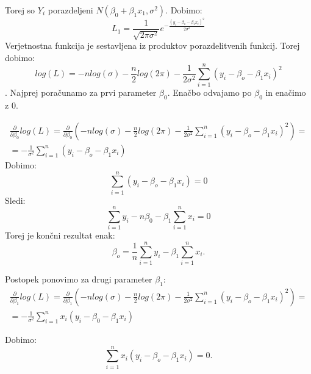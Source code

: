 \documentclass{article}
\begin{document}
Torej so $Y_i$ porazdeljeni $N( \beta_0+\beta_1x_1, \sigma^2)$.
Dobimo:
\begin{equation*}
L_1 = \frac{1}{\sqrt{2\pi \sigma^2}}e^{-{\frac{(y_i - \beta_o-\beta_1x_i)^2}{2\sigma^2}}}
\end{equation*}
Verjetnostna funkcija je sestavljena iz produktov porazdelitvenih funkcij. Torej dobimo:
\begin{equation*}
log(L) = -nlog(\sigma) - \frac{n}{2}log(2\pi)-\frac{1}{2\sigma^2}\sum_{i=1}^n (y_i-\beta_o-\beta_1x_i)^2
\end{equation*}.
Najprej poračunamo za prvi parameter $\beta_0$. Enačbo odvajamo po $\beta_0$ in enačimo z 0.

\begin{equation*}
\begin{split}
\frac{\partial}{\partial\beta_0} log(L) = \frac{\partial}{\partial\beta_0} (  -nlog(\sigma) - \frac{n}{2}log(2\pi)-\frac{1}{2\sigma^2}\sum_{i=1}^n (y_i-\beta_o-\beta_1x_i)^2)=\\
= -\frac{1}{\sigma^2}\sum_{i=1}^n(y_i-\beta_o-\beta_1x_i)
\end{split}
\end{equation*}
Dobimo:
\begin{equation*}
\sum_{i=1}^n(y_i-\beta_o-\beta_1x_i) = 0
\end{equation*}
Sledi:
\begin{equation*}
\sum_{i=1}^n y_i - n\beta_0 -\beta_1\sum_{i=1}^nx_i = 0
\end{equation*}
Torej je končni rezultat enak:
\begin{equation*}
\beta_o = \frac{1}{n} \sum_{i=1}^n y_i - \beta_1\sum_{i=1}^nx_i.
\end{equation*}

Postopek ponovimo za drugi parameter $\beta_1$:
\begin{equation*}
\begin{split}
\frac{\partial}{\partial\beta_1} log(L) = \frac{\partial}{\partial\beta_1} (  -nlog(\sigma) - \frac{n}{2}log(2\pi)-\frac{1}{2\sigma^2}\sum_{i=1}^n (y_i-\beta_o-\beta_1x_i)^2)=\\
= -\frac{1}{\sigma^2}\sum_{i=1}^n x_i(y_i-\beta_0-\beta_1x_i)
\end{split}
\end{equation*}

Dobimo:
\begin{equation*}
\sum_{i=1}^nx_i(y_i-\beta_o-\beta_1x_i) = 0.
\end{equation*}
\end{document}
